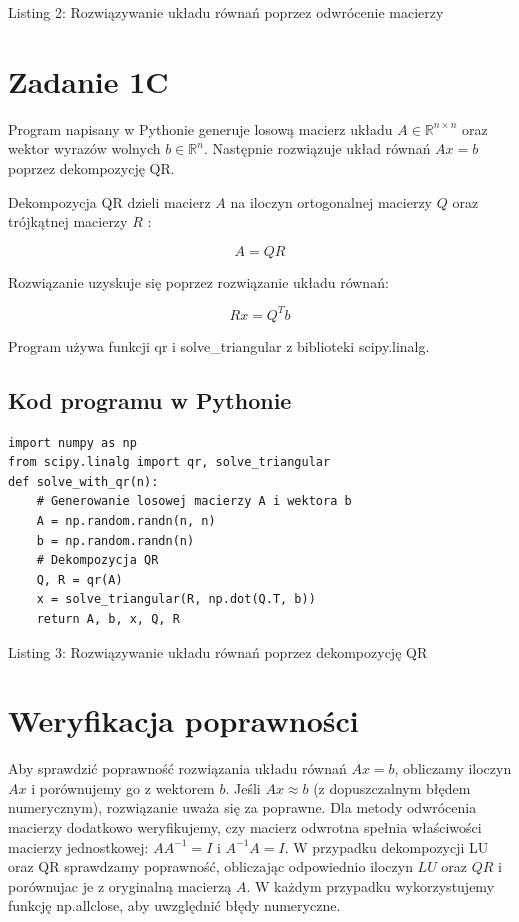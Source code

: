 \documentclass[10pt]{article}
\begin{document}
Listing 2: Rozwiązywanie układu równań poprzez odwrócenie macierzy

\section*{Zadanie 1C}
Program napisany w Pythonie generuje losową macierz układu $A \in \mathbb{R}^{n \times n}$ oraz wektor wyrazów wolnych $b \in \mathbb{R}^{n}$. Następnie rozwiązuje układ równań $A x=b$ poprzez dekompozycję QR.

Dekompozycja QR dzieli macierz $A$ na iloczyn ortogonalnej macierzy $Q$ oraz trójkątnej macierzy $R$ :

$$
A=Q R
$$

Rozwiązanie uzyskuje się poprzez rozwiązanie układu równań:

$$
R x=Q^{T} b
$$

Program używa funkcji qr i solve\_triangular z biblioteki scipy.linalg.

\subsection*{Kod programu w Pythonie}
\begin{verbatim}
import numpy as np
from scipy.linalg import qr, solve_triangular
def solve_with_qr(n):
    # Generowanie losowej macierzy A i wektora b
    A = np.random.randn(n, n)
    b = np.random.randn(n)
    # Dekompozycja QR
    Q, R = qr(A)
    x = solve_triangular(R, np.dot(Q.T, b))
    return A, b, x, Q, R
\end{verbatim}

Listing 3: Rozwiązywanie układu równań poprzez dekompozycję QR

\section*{Weryfikacja poprawności}
Aby sprawdzić poprawność rozwiązania układu równań $A x=b$, obliczamy iloczyn $A x$ i porównujemy go z wektorem $b$. Jeśli $A x \approx b$ (z dopuszczalnym błędem numerycznym), rozwiązanie uważa się za poprawne. Dla metody odwrócenia macierzy dodatkowo weryfikujemy, czy macierz odwrotna spełnia właściwości macierzy jednostkowej: $A A^{-1}=I$ i $A^{-1} A=I$. W przypadku dekompozycji LU oraz QR sprawdzamy poprawność, obliczając odpowiednio iloczyn $L U$ oraz $Q R$ i porównujac je z oryginalną macierzą $A$. W każdym przypadku wykorzystujemy funkcję np.allclose, aby uwzględnić błędy numeryczne.
\end{document}
